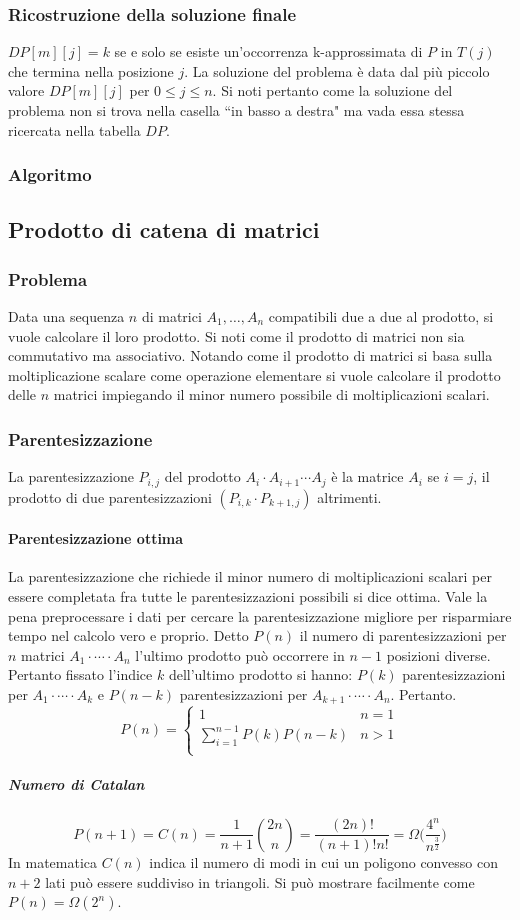 \subsubsection{Ricostruzione della soluzione finale}
$DP[m][j] = k$ se e solo se esiste un'occorrenza k-approssimata di $P$ in $T(j)$ che termina nella posizione $j$. La soluzione del problema \`e data dal pi\`u piccolo valore  $DP[m][j]$ 
per $0\le j\le n$. Si noti pertanto come la soluzione del problema non si trova nella casella ``in basso a destra" ma vada essa stessa ricercata nella tabella $DP$.
\subsubsection{Algoritmo}

\subsection{Prodotto di catena di matrici}
\subsubsection{Problema}
Data una sequenza $n$ di matrici $A_1, \dots, A_n$ compatibili due a due al prodotto, si vuole calcolare il loro prodotto. Si noti come il prodotto di 
matrici non sia commutativo ma associativo. Notando come il prodotto di matrici si basa sulla moltiplicazione scalare come operazione elementare si vuole
calcolare il prodotto delle $n$ matrici impiegando il minor numero possibile di moltiplicazioni scalari. 
\subsubsection{Parentesizzazione}
La parentesizzazione $P_{i, j}$ del prodotto $A_i\cdot A_{i+1}\cdots A_j$ \`e la matrice $A_i$ se $i=j$, il prodotto di due parentesizzazioni $(P_{i,k}
\cdot P_{k+1, j})$ altrimenti. 
\paragraph{Parentesizzazione ottima}
La parentesizzazione che richiede il minor numero di moltiplicazioni scalari per essere completata fra tutte le parentesizzazioni possibili si dice 
ottima. Vale la pena preprocessare i dati per cercare la parentesizzazione migliore per risparmiare tempo nel calcolo vero e proprio. Detto $P(n)$ il
numero di parentesizzazioni per $n$ matrici $A_1\cdot\cdots\cdot A_n$ l'ultimo prodotto pu\`o occorrere in $n-1$ posizioni diverse. Pertanto fissato 
l'indice $k$ dell'ultimo prodotto si hanno: $P(k)$ parentesizzazioni per $A_1\cdot\cdots\cdot A_k$ e $P(n-k)$ parentesizzazioni per  $A_{k+1}\cdot\cdots
\cdot A_n$. Pertanto.
$$P(n) = 
\begin{cases}
	1 & n =1 \\
	\sum\limits_{i = 1}^{n-1} P(k)P(n-k) & n > 1\\
\end{cases}$$
\subparagraph{Numero di Catalan}
$$P(n+1) = C(n) = \dfrac{1}{n+1}\binom{2n}{n} = \dfrac{(2n)!}{(n+1)!n!} = \Omega\biggl(\dfrac{4^n}{n^{\frac{3}{2}}}\biggr)$$
In matematica $C(n)$ indica il numero di modi in cui un poligono convesso con $n+2$ lati pu\`o essere suddiviso in triangoli. Si pu\`o mostrare facilmente
come $P(n)=\Omega(2^n)$. 
